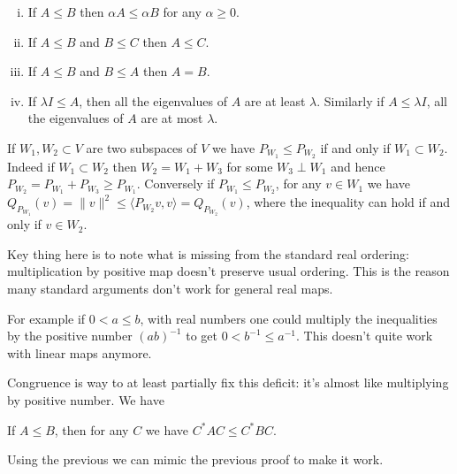 \begin{prop}
\begin{enumerate}[(i)]
		\item If $A \leq B$ then $\alpha A \leq \alpha B$ for any $\alpha \geq 0$.
		\item If $A \leq B$ and $B \leq C$ then $A \leq C$.
		\item If $A \leq B$ and $B \leq A$ then $A = B$.
		\item If $\lambda I \leq A$, then all the eigenvalues of $A$ are at least $\lambda$. Similarly if $A \leq \lambda I$, all the eigenvalues of $A$ are at most $\lambda$.
\end{enumerate}
\end{prop}

\begin{esim}
	If $W_{1}, W_{2} \subset V$ are two subspaces of $V$ we have $P_{W_{1}} \leq P_{W_{2}}$ if and only if $W_{1} \subset W_{2}$. Indeed if $W_{1} \subset W_{2}$ then $W_{2} = W_{1} + W_{3}$ for some $W_{3} \perp W_{1}$ and hence $P_{W_{2}} = P_{W_{1}} + P_{W_{3}} \geq P_{W_{1}}$. Conversely if $P_{W_{1}} \leq P_{W_{2}}$, for any $v \in W_{1}$ we have $Q_{{P_{W_{1}}}}(v) = \|v\|^{2} \leq \langle P_{W_{2}} v, v \rangle = Q_{P_{W_{2}}}(v)$, where the inequality can hold if and only if $v \in W_{2}$.
\end{esim}

Key thing here is to note what is missing from the standard real ordering: multiplication by positive map doesn't preserve usual ordering. This is the reason many standard arguments don't work for general real maps.

For example if $0 < a \leq b$, with real numbers one could multiply the inequalities by the positive number $(a b)^{-1}$ to get $0 < b^{-1} \leq a^{-1}$. This doesn't quite work with linear maps anymore.

Congruence is way to at least partially fix this deficit: it's almost like multiplying by positive number. We have
\begin{prop}
	If $A \leq B$, then for any $C$ we have $C^{*} A C \leq C^{*} B C$.
\end{prop}

Using the previous we can mimic the previous proof to make it work.


